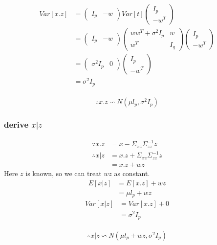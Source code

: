 \documentclass{report}
\begin{document}
\begin{equation}
\begin{aligned}
Var[x.z] 
&= 
\left (
\begin{matrix}
I_p & -w
\end{matrix}
\right )
Var[t]
 \left (
\begin{matrix}
I_p \\ -w^T
\end{matrix}
\right )\\
&= 
\left (
\begin{matrix}
I_p & -w
\end{matrix}
\right )
\left (
\begin{matrix}
ww^T + \sigma^2 I_p & w\\
w^T & I_q
\end{matrix}
\right )
\left (
\begin{matrix}
I_p \\ -w^T
\end{matrix}
\right )\\
&=
\left (
\begin{matrix}
\sigma^2 I_p & 0
\end{matrix}
\right )
\left (
\begin{matrix}
I_p \\ -w^T
\end{matrix}
\right )\\
&=\sigma^2 I_p
\end{aligned}
\end{equation}
\\
\begin{equation}
\therefore 
x.z \backsim N(\mu l_p, \sigma^2 I_p)
\end{equation}
\subsubsection{derive $x|z$}
\begin{equation}
\begin{aligned}
\because 
x.z &= x - \Sigma_{xz} \Sigma_{zz}^{-1} z\\
\therefore 
x|z &= x.z + \Sigma_{xz} \Sigma_{zz}^{-1}z\\
&= x.z + wz
\end{aligned}
\end{equation}
Here $z$ is known, so we can treat $wz$ as constant.
\begin{equation}
\begin{aligned}
E[x|z] &= E[x.z] + wz\\
&= \mu l_p + wz
\end{aligned}
\end{equation}
\begin{equation}
\begin{aligned}
Var[x|z] &= Var[x.z] + 0\\
&= \sigma^2 I_p
\end{aligned}
\end{equation}\\
\begin{equation}
\therefore
x|z \backsim N(\mu l_p + wz, \sigma^2 I_p)
\end{equation}
\end{document}
